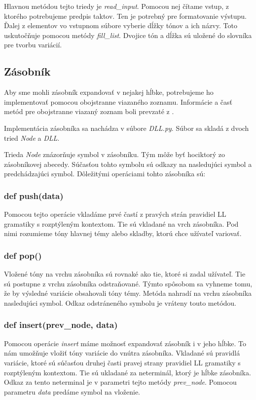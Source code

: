 Hlavnou metódou tejto triedy je \textit{read\_input}. Pomocou nej čítame vstup, z ktorého potrebujeme predpis taktov. Ten je potrebný pre formatovanie výstupu. Ďalej z elementov vo vstupnom súbore vyberie dĺžky tónov a ich názvy. Toto uskutočňuje pomocou metódy \textit{fill\_list}. Dvojice tón a dĺžka sú uložené do slovníka pre tvorbu variácií.

\subsection{Zásobník}
Aby sme mohli zásobník expandovať v nejakej hĺbke, potrebujeme ho implementovať pomocou obojstranne viazaného zoznamu. Informácie a časť metód pre obojstranne viazaný zoznam boli prevzaté z \cite{dll:site}.

Implementácia zásobníka sa nachádza v súbore \textit{DLL.py}. Súbor sa skladá z dvoch tried \textit{Node} a \textit{DLL}.

Trieda \textit{Node} znázorňuje symbol v zásobníku. Tým môže byť hociktorý zo zásobníkovej abecedy. Súčasťou tohto symbolu sú odkazy na nasledujúci symbol a predchádzajúci symbol. Dôležitými operáciami tohto zásobníka sú:

\subsubsection*{def push(data)}
Pomocou tejto operácie vkladáme prvé častí z pravých strán pravidiel LL gramatiky s rozptýleným kontextom. Tie sú vkladané na vrch zásobníka. Pod nimi rozumieme tóny hlavnej témy alebo skladby, ktorú chce užívateľ variovať.

\subsubsection*{def pop()}
Vložené tóny na vrchu zásobníka sú rovnaké ako tie, ktoré si zadal užívateľ. Tie sú postupne z vrchu zásobníka odstraňované. Týmto spôsobom sa vyhneme tomu, že by výsledné variácie obsahovali tóny témy. Metóda nahradí na vrchu zásobníka nasledujúci symbol. Odkaz odstráneného symbolu je vráteny touto metódou.

\subsubsection*{def insert(prev\_node, data)}
Pomocou operácie \textit{insert} máme možnosť expandovať zásobník i v jeho hĺbke. To nám umožňuje vložiť tóny variácie do vnútra zásobníka. Vkladané sú pravidlá variácie, ktoré sú súčasťou druhej časti pravej strany pravidiel LL gramatiky s rozptýleným kontextom. Tie sú ukladané za neterminál, ktorý je hĺbke zásobníka. Odkaz za tento neterminal je v parametri tejto metódy \textit{prev\_node}. Pomocou parametru \textit{data} predáme symbol na vloženie.

